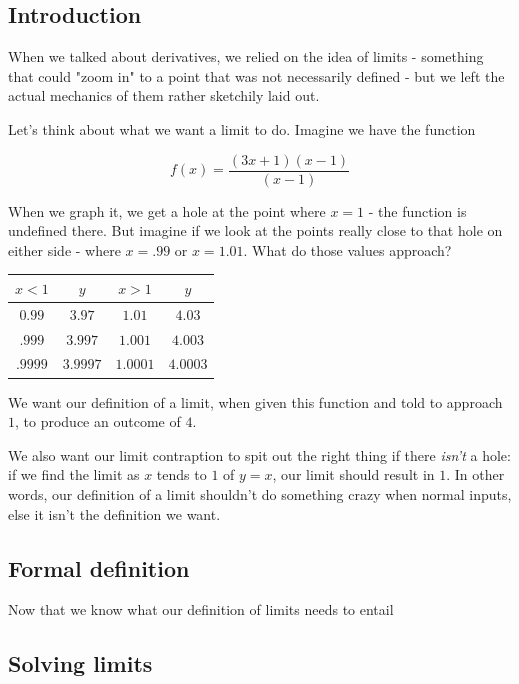 \subsection{Introduction}

When we talked about derivatives, we relied on the idea of limits - something that could "zoom in" to a point that was not necessarily defined - but we left the actual mechanics of them rather sketchily laid out.

Let's think about what we want a limit to do. Imagine we have the function

\begin{equation*}
    f(x) = \frac{(3x+1)(x-1)}{(x-1)}
\end{equation*}

When we graph it, we get a hole at the point where $x=1$ - the function is undefined there. But imagine if we look at the points really close to that hole on either side - where $x=.99$ or $x = 1.01$. What do those values approach?

\begin{center}
    \begin{tabular}{c|c|c|c}
       $x < 1$  &  $y$ & $x > 1$ & $y$\\
       \hline
        $0.99$ & $3.97$ & $1.01$&$4.03$ \\
        $.999$ & $3.997$ & $1.001$&$4.003$ \\
        $.9999$ & $3.9997$ & $1.0001$& $4.0003$
    \end{tabular}
\end{center}

We want our definition of a limit, when given this function and told to approach $1$, to produce an outcome of $4$.

We also want our limit contraption to spit out the right thing if there {\it isn't} a hole: if we find the limit as $x$ tends to $1$ of $y=x$, our limit should result in $1$. In other words, our definition of a limit shouldn't do something crazy when normal inputs, else it isn't the definition we want.

\subsection{Formal definition}

Now that we know what our definition of limits needs to entail

\subsection{Solving limits}
